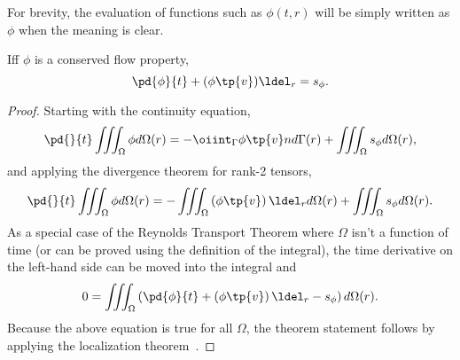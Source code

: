 \begin{rk}
    For brevity, the evaluation of functions such as $\phi(t,r)$ will be simply written
    as $\phi$ when the meaning is clear.
\end{rk}

\begin{thm}
Iff $\phi$ is a conserved flow property,
\begin{equation}
    \label{continuity0}
    \pd{\phi}{t} + ( \phi \tp{v} ) \ldel_r = s_\phi.
\end{equation}
\end{thm}

\begin{proof}
    Starting with the continuity equation,
    \begin{equation}
        \pd{}{t} \iiint_\Omega \phi d\Omega(r) =
        -\oiint_\Gamma \phi \tp{v} n d\Gamma(r)
        + \iiint_\Omega s_\phi d\Omega(r),
    \end{equation}
    and applying the divergence theorem for rank-2 tensors,
    \begin{equation}
        \pd{}{t} \iiint_\Omega \phi d\Omega(r) =
        -\iiint_\Omega \left(\phi \tp{v} \right) \ldel_r d\Omega(r)
        + \iiint_\Omega s_\phi d\Omega(r).
    \end{equation}
    As a special case of the Reynolds Transport Theorem where $\Omega$ isn't
    a function of time (or can be proved using the definition of the integral),
    the time derivative on the left-hand side can be moved into the integral and
    \begin{equation}
        0 = \iiint_\Omega \left( \pd{\phi}{t} +
        \left(\phi \tp{v} \right) \ldel_r
        - s_\phi \right) d\Omega(r).
    \end{equation}
    Because the above equation is true for all $\Omega$, the theorem
    statement follows by applying the localization theorem~\cite{wiki}.
\end{proof}

